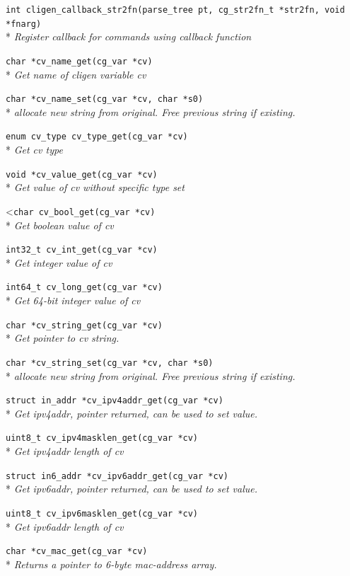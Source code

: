 \documentclass[a4paper, 10pt] {article}
\begin{document}
{{\tt int cligen\_callback\_str2fn(parse\_tree pt, cg\_str2fn\_t *str2fn, void *fnarg)}\\*
\emph{  Register callback for commands using callback function}

{\tt char *cv\_name\_get(cg\_var *cv)}\\*
\emph{ Get name of cligen variable cv}

{\tt char *cv\_name\_set(cg\_var *cv, char *s0)}\\*
\emph{ allocate new string from original. Free previous string if existing.}

{\tt enum cv\_type cv\_type\_get(cg\_var *cv)}\\*
\emph{ Get cv type}

{\tt void *cv\_value\_get(cg\_var *cv)}\\*
\emph{ Get value of cv without specific type set}

<{\tt char cv\_bool\_get(cg\_var *cv)}\\*
\emph{ Get boolean value of cv}

{\tt int32\_t cv\_int\_get(cg\_var *cv)}\\*
\emph{ Get integer value of cv}

{\tt int64\_t cv\_long\_get(cg\_var *cv)}\\*
\emph{ Get 64-bit integer value of cv}

{\tt char *cv\_string\_get(cg\_var *cv)}\\*
\emph{ Get pointer to cv string. }

{\tt char *cv\_string\_set(cg\_var *cv, char *s0)}\\*
\emph{ allocate new string from original. Free previous string if existing.}

{\tt struct in\_addr *cv\_ipv4addr\_get(cg\_var *cv)}\\*
\emph{ Get ipv4addr, pointer returned, can be used to set value.}

{\tt uint8\_t cv\_ipv4masklen\_get(cg\_var *cv)}\\*
\emph{ Get ipv4addr length of cv}

{\tt struct in6\_addr *cv\_ipv6addr\_get(cg\_var *cv)}\\*
\emph{ Get ipv6addr, pointer returned, can be used to set value.}

{\tt uint8\_t cv\_ipv6masklen\_get(cg\_var *cv)}\\*
\emph{ Get ipv6addr length of cv}

{\tt char *cv\_mac\_get(cg\_var *cv)}\\*
\emph{  Returns a pointer to 6-byte mac-address array. }

}
\end{document}
